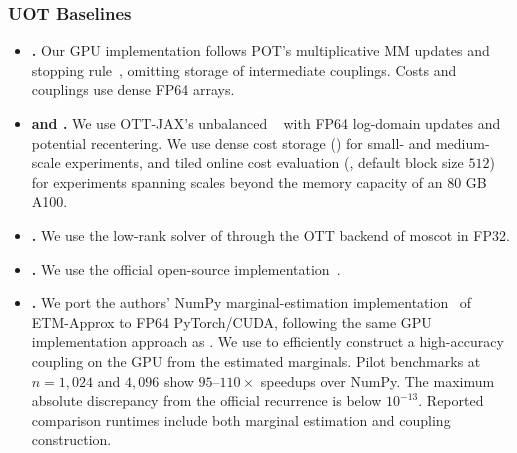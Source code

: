\subsubsection{UOT Baselines}
\label{app:implementation-uot-baselines}
\label{app:implementation-extra-baselines}

\begin{itemize}
\item \textbf{\mm.}
Our GPU implementation follows POT's multiplicative MM updates and stopping rule~\citep{chapel2021unbalanced}, omitting storage of intermediate couplings.
Costs and couplings use dense FP64 arrays.

\item \textbf{\sinkhorn and \sinkhornonline.}
We use OTT-JAX's unbalanced \sinkhorn~\citep{chizat2018scaling} with FP64 log-domain updates and potential recentering.
We use dense cost storage (\sinkhorn) for small- and medium-scale experiments, and tiled online cost evaluation (\sinkhornonline, default block size $512$) for experiments spanning scales beyond the memory capacity of an 80 GB A100.

\item \textbf{\ulot.}
We use the low-rank solver of \citet{scetbon2023unbalanced} through the OTT backend of moscot in FP32.

\item \textbf{\hellouot.}
We use the official open-source \hellouot implementation~\citep{xia2026dual}.

\item \textbf{\etm.}
We port the authors' NumPy marginal-estimation implementation~\citep{liu2026solving} of ETM-Approx to FP64 PyTorch/CUDA, following the same GPU implementation approach as \ours.
We use \hello to efficiently construct a high-accuracy coupling on the GPU from the estimated marginals.
Pilot benchmarks at $n=1{,}024$ and $4{,}096$ show $95$--$110\times$ speedups over NumPy.
The maximum absolute discrepancy from the official recurrence is below $10^{-13}$.
Reported comparison runtimes include both marginal estimation and coupling construction.


\end{itemize}
